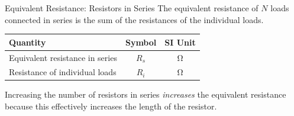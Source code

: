 \documentclass[12pt,aspectratio=169]{beamer}
\begin{document}
\begin{frame}{Equivalent Resistance: Resistors in Series}
  The equivalent resistance of $N$ loads connected in series is the sum of the
  resistances of the individual loads.
  
  \begin{center}
    \begin{tabular}{l|c|c}
      \rowcolor{pink}
      \textbf{Quantity} & \textbf{Symbol} & \textbf{SI Unit} \\ \hline
      Equivalent resistance in series & $R_s$ & \si\ohm \\
      Resistance of individual loads  & $R_i$ & \si\ohm
    \end{tabular}
  \end{center}
  Increasing the number of resistors in series \emph{increases} the equivalent
  resistance because this effectively increases the length of the resistor.
\end{frame}


%
\end{document}
